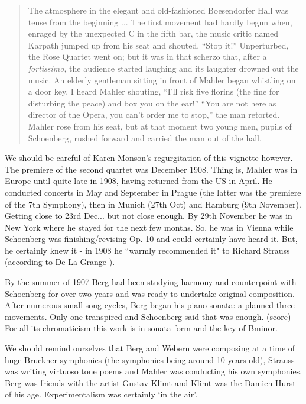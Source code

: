 \begin{quotation}
The atmosphere in the elegant and old-fashioned Boesendorfer Hall was tense from the beginning ... The first 
movement had hardly begun when, enraged by the unexpected C in the fifth bar, the music critic named Karpath 
jumped up from his seat and shouted, ``Stop it!'' Unperturbed, the Rose Quartet went on; but it was in that 
scherzo that, after a \textit{fortissimo}, the audience started laughing and its laughter drowned out the 
music. An elderly gentleman sitting in front of Mahler began whistling on a door key. I heard Mahler 
shouting, ``I'll risk five florins (the fine for disturbing the peace) and box you on the ear!'' ``You are 
not here as director of the Opera, you can't order me to stop,'' the man retorted. Mahler rose from his seat, 
but at that moment two young men, pupils of Schoenberg, rushed forward and carried the man out of the hall.
\citep[p32]{monson1979alban}
\end{quotation} 

We should be careful of Karen Monson's  regurgitation of this vignette however. The premiere of the second 
quartet was December 1908. Thing is, Mahler was in Europe until quite late in 1908, having returned from the 
US in April. He conducted concerts in May and September in Prague (the latter was the premiere of the 7th 
Symphony), then in Munich (27th Oct) and Hamburg (9th November). Getting close to 23rd Dec... but not close 
enough. By 29th November he was in New York where he stayed for the next few months. So, he was in Vienna 
while Schoenberg was finishing/revising Op. 10 and could certainly have heard it. But, he certainly knew it - 
in 1908 he ``warmly recommended it" to Richard Strauss (according to De La Grange \citeyearpar{de2007gustav}). 

By the summer of 1907 Berg had been studying harmony and counterpoint with Schoenberg for over two years and was ready to undertake original composition. After numerous small song cycles, Berg began his piano sonata: a planned three movements. Only one transpired and Schoenberg said that was enough. (\href{http://petrucci.mus.auth.gr/imglnks/usimg/7/75/IMSLP234327-SIBLEY1802.21900.4ff7-39087012041663score.pdf}{score})
For all its chromaticism this work is in sonata form and the key of Bminor. 

We should remind ourselves that Berg and Webern were composing at a time of huge Bruckner symphonies (the symphonies being around 10 years old), Strauss was writing virtuoso tone poems and Mahler was conducting his own symphonies. 
Berg was friends with the artist Gustav Klimt and Klimt was the Damien Hurst of his age. Experimentalism was certainly `in the air'.

